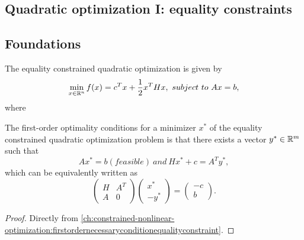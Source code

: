 \begin{refsection}
\section{Quadratic optimization I: equality constraints}
\subsection{Foundations}
\begin{definition}\label{ch:constrained-nonlinear-optimization:def:equalityconstraintQuadraticOptimization}
The equality constrained quadratic optimization is given by
$$\min_{x\in \mathbb{R}^n} f(x) = c^Tx + \frac{1}{2}x^THx, ~subject~to~ Ax = b,$$
where 
\end{definition}

\begin{lemma}\cite[lec 6]{Robinson2015nonlinear2}\label{ch:constrained-nonlinear-optimization:th:KKTconditionQuadraticProgramming}
The first-order optimality conditions for a minimizer $x^*$ of the equality constrained quadratic optimization problem is that there exists a vector $y^*\in\mathbb{R}^m$ such that
$$Ax^* = b (feasible) ~and~ Hx^* + c = A^Ty^*,$$
which can be equivalently written as
$$\begin{pmatrix}
H &A^T\\
A &0
\end{pmatrix}\begin{pmatrix}
x^*\\
-y^*
\end{pmatrix} = \begin{pmatrix}
-c\\
b
\end{pmatrix}.$$
\end{lemma}
\begin{proof}
Directly from \autoref{ch:constrained-nonlinear-optimization:firstordernecessaryconditionequalityconstraint}.
\end{proof}



\end{refsection}
